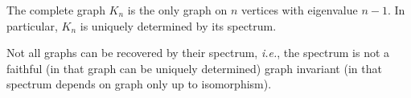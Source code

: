 \begin{corollary}
The complete graph \(K_n\) is the only graph on \(n\) vertices with eigenvalue \(n-1\).
In particular, \(K_n\) is uniquely determined by its spectrum.
\end{corollary}
\begin{remark}
Not all graphs can be recovered by their spectrum, \textit{i.e.}, the spectrum is not a faithful (in that graph can be uniquely determined) graph invariant (in that spectrum depends on graph only up to isomorphism).
\end{remark}